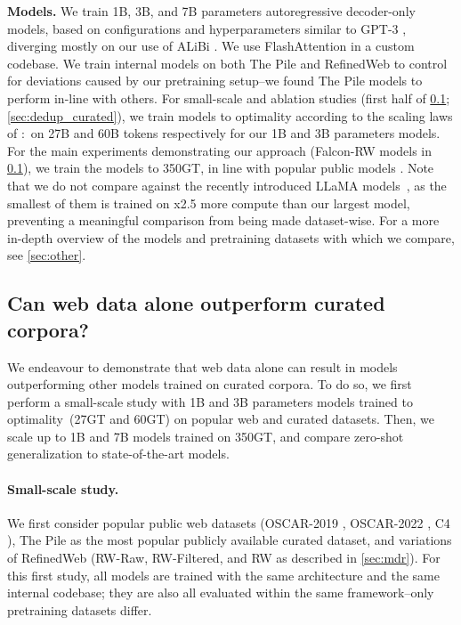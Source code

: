\textbf{Models.} We train 1B, 3B, and 7B parameters autoregressive decoder-only models, based on configurations and hyperparameters similar to GPT-3 \cite{brown2020language}, diverging mostly on our use of ALiBi \cite{press2021train}. We use FlashAttention \cite{daoflashattention} in a custom codebase. We train internal models on both The Pile and RefinedWeb to control for deviations caused by our pretraining setup--we found The Pile models to perform in-line with others. For small-scale and ablation studies (first half of \ref{sec:web_outperf_curated}; \ref{sec:dedup_curated}), we train models to optimality according to the scaling laws of \citet{hoffmann2022training}:~on 27B and 60B tokens respectively for our 1B and 3B parameters models. For the main experiments demonstrating our approach (Falcon-RW models in \ref{sec:web_outperf_curated}), we train the models to 350GT, in line with popular public models \cite{brown2020language, gpt-j, scao2022bloom}. Note that we do not compare against the recently introduced LLaMA models~\cite{touvron2023llama}, as the smallest of them is trained on x2.5 more compute than our largest model, preventing a meaningful comparison from being made dataset-wise. For a more in-depth overview of the models and pretraining datasets with which we compare, see \ref{sec:other}.

\subsection{Can web data alone outperform curated corpora?}
\label{sec:web_outperf_curated}

We endeavour to demonstrate that web data alone can result in models outperforming other models trained on curated corpora. To do so, we first perform a small-scale study with 1B and 3B parameters models trained to optimality~(27GT and 60GT) on popular web and curated datasets. Then, we scale up to 1B and 7B models trained on 350GT, and compare zero-shot generalization to state-of-the-art models.

\paragraph{Small-scale study.} We first consider popular public web datasets (OSCAR-2019 \cite{OrtizSuarezSagotRomary2019}, OSCAR-2022 \cite{AbadjiOrtizSuarezRomaryetal.2021}, C4 \cite{2020t5}), The Pile \cite{gao2020pile} as the most popular publicly available curated dataset, and variations of RefinedWeb (RW-Raw, RW-Filtered, and RW as described in \ref{sec:mdr}). For this first study, all models are trained with the same architecture and the same internal codebase; they are also all evaluated within the same framework--only pretraining datasets differ.


